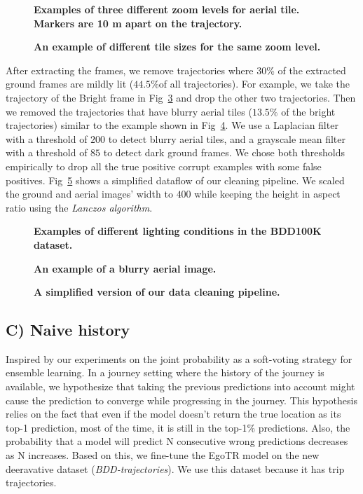 \documentclass[10pt,letterpaper]{article}
\begin{document}
\begin{figure}[!h]
  \caption{{\bf Examples of three different zoom levels for aerial tile. Markers are 10 m apart on the trajectory.}}
  \label{fig3}
\end{figure}

\begin{figure}[!h]
  \caption{{\bf An example of different tile sizes for the same zoom level.}}
  \label{fig4}
\end{figure}

After extracting the frames, we remove trajectories where 30\% of the extracted ground frames are mildly lit ($44.5\%$of all trajectories). For example, we take the trajectory of the Bright frame in Fig~\ref{fig5} and drop the other two trajectories. Then we removed the trajectories that have blurry aerial tiles ($13.5\%$ of the bright trajectories) similar to the example shown in Fig~\ref{fig6}. We use a Laplacian filter~\cite{bib11} with a threshold of $200$ to detect blurry aerial tiles, and a grayscale mean filter with a threshold of $85$ to detect dark ground frames. We chose both thresholds empirically to drop all the true positive corrupt examples with some false positives. Fig~\ref{fig7} shows a simplified dataflow of our cleaning pipeline. We scaled the ground and aerial images’ width to $400$ while keeping the height in aspect ratio using the \emph{Lanczos algorithm}.

\begin{figure}[!h]
  \caption{{\bf Examples of different lighting conditions in the BDD100K dataset.}}
  \label{fig5}
\end{figure}

\begin{figure}[!h]
  \caption{{\bf An example of a blurry aerial image.}}
  \label{fig6}
\end{figure}

\begin{figure}[!h]
  \caption{{\bf A simplified version of our data cleaning pipeline.}}
  \label{fig7}
\end{figure}

\subsection*{C) Naive history}
Inspired by our experiments on the joint probability as a soft-voting strategy for ensemble learning. In a journey setting where the history of the journey is available, we hypothesize that taking the previous predictions into account might cause the prediction to converge while progressing in the journey. This hypothesis relies on the fact that even if the model doesn't return the true location as its top-1 prediction, most of the time, it is still in the top-1\% predictions. Also, the probability that a model will predict N consecutive wrong predictions decreases as N increases. Based on this, we fine-tune the EgoTR model on the new deeravative dataset (\emph{BDD-trajectories}). We use this dataset because it has trip trajectories.
\end{document}
